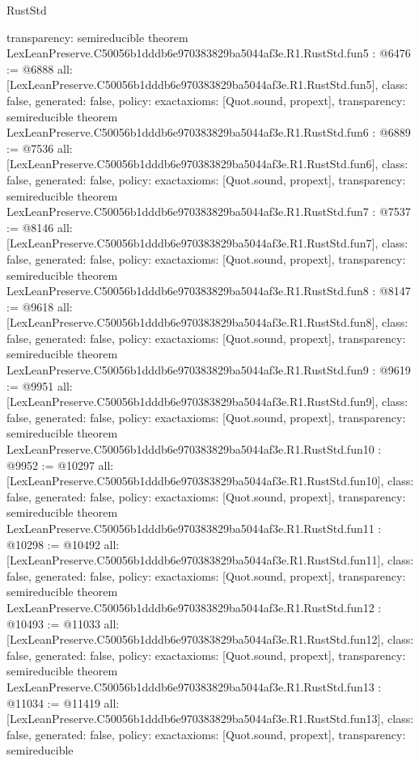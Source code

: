 \begin{lexlean}{RustStd}
\begin{coremodule}
{  transparency: semireducible
}
theorem LexLeanPreserve.C50056b1dddb6e970383829ba5044af3e.R1.RustStd.fun5 : @6476 := @6888 {
  all: [LexLeanPreserve.C50056b1dddb6e970383829ba5044af3e.R1.RustStd.fun5],
  class: false,
  generated: false,
  policy: exact{axioms: [Quot.sound, propext]},
  transparency: semireducible
}
theorem LexLeanPreserve.C50056b1dddb6e970383829ba5044af3e.R1.RustStd.fun6 : @6889 := @7536 {
  all: [LexLeanPreserve.C50056b1dddb6e970383829ba5044af3e.R1.RustStd.fun6],
  class: false,
  generated: false,
  policy: exact{axioms: [Quot.sound, propext]},
  transparency: semireducible
}
theorem LexLeanPreserve.C50056b1dddb6e970383829ba5044af3e.R1.RustStd.fun7 : @7537 := @8146 {
  all: [LexLeanPreserve.C50056b1dddb6e970383829ba5044af3e.R1.RustStd.fun7],
  class: false,
  generated: false,
  policy: exact{axioms: [Quot.sound, propext]},
  transparency: semireducible
}
theorem LexLeanPreserve.C50056b1dddb6e970383829ba5044af3e.R1.RustStd.fun8 : @8147 := @9618 {
  all: [LexLeanPreserve.C50056b1dddb6e970383829ba5044af3e.R1.RustStd.fun8],
  class: false,
  generated: false,
  policy: exact{axioms: [Quot.sound, propext]},
  transparency: semireducible
}
theorem LexLeanPreserve.C50056b1dddb6e970383829ba5044af3e.R1.RustStd.fun9 : @9619 := @9951 {
  all: [LexLeanPreserve.C50056b1dddb6e970383829ba5044af3e.R1.RustStd.fun9],
  class: false,
  generated: false,
  policy: exact{axioms: [Quot.sound, propext]},
  transparency: semireducible
}
theorem LexLeanPreserve.C50056b1dddb6e970383829ba5044af3e.R1.RustStd.fun10 : @9952 := @10297 {
  all: [LexLeanPreserve.C50056b1dddb6e970383829ba5044af3e.R1.RustStd.fun10],
  class: false,
  generated: false,
  policy: exact{axioms: [Quot.sound, propext]},
  transparency: semireducible
}
theorem LexLeanPreserve.C50056b1dddb6e970383829ba5044af3e.R1.RustStd.fun11 : @10298 := @10492 {
  all: [LexLeanPreserve.C50056b1dddb6e970383829ba5044af3e.R1.RustStd.fun11],
  class: false,
  generated: false,
  policy: exact{axioms: [Quot.sound, propext]},
  transparency: semireducible
}
theorem LexLeanPreserve.C50056b1dddb6e970383829ba5044af3e.R1.RustStd.fun12 : @10493 := @11033 {
  all: [LexLeanPreserve.C50056b1dddb6e970383829ba5044af3e.R1.RustStd.fun12],
  class: false,
  generated: false,
  policy: exact{axioms: [Quot.sound, propext]},
  transparency: semireducible
}
theorem LexLeanPreserve.C50056b1dddb6e970383829ba5044af3e.R1.RustStd.fun13 : @11034 := @11419 {
  all: [LexLeanPreserve.C50056b1dddb6e970383829ba5044af3e.R1.RustStd.fun13],
  class: false,
  generated: false,
  policy: exact{axioms: [Quot.sound, propext]},
  transparency: semireducible
}
\end{coremodule}
\end{lexlean}
